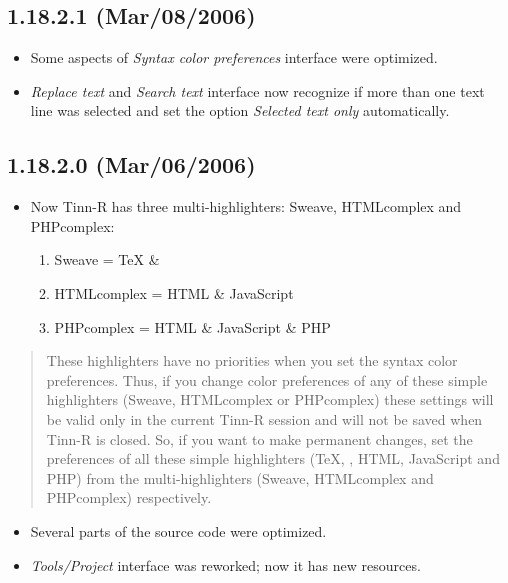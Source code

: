 \subsection*{1.18.2.1 (Mar/08/2006)}
\begin{itemize}
  \item Some aspects of \textit{Syntax color preferences} interface
    were optimized.
  \item \textit{Replace text} and \textit{Search text} interface now
    recognize if more than one text line was selected and set the
    option \textit{Selected text only} automatically.
\end{itemize}


\subsection*{1.18.2.0 (Mar/06/2006)}
\begin{itemize}
  \item Now Tinn-R has three multi-highlighters: Sweave, HTMLcomplex
    and PHPcomplex:
    \begin{enumerate}
      \item Sweave      = TeX  \& \RR{}
      \item HTMLcomplex = HTML \& JavaScript
      \item PHPcomplex  = HTML \& JavaScript \& PHP
    \end{enumerate}
\end{itemize}

\begin{footnotesize}
  \begin{quotation}
    These highlighters have no priorities when you set the
    syntax color preferences. Thus, if you change color preferences of
    any of these simple highlighters (Sweave, HTMLcomplex or PHPcomplex) these
    settings will be valid only in the current Tinn-R session and will not be
    saved when Tinn-R is closed. So, if you want to make permanent changes, set
    the preferences of all these simple highlighters (TeX, \RR, HTML, JavaScript
    and PHP) from the multi-highlighters (Sweave, HTMLcomplex and PHPcomplex)
    respectively.
  \end{quotation}
\end{footnotesize}

\begin{itemize}
  \item Several parts of the source code were optimized.
  \item \textit{Tools/Project} interface was reworked; now it has new resources.
\end{itemize}



